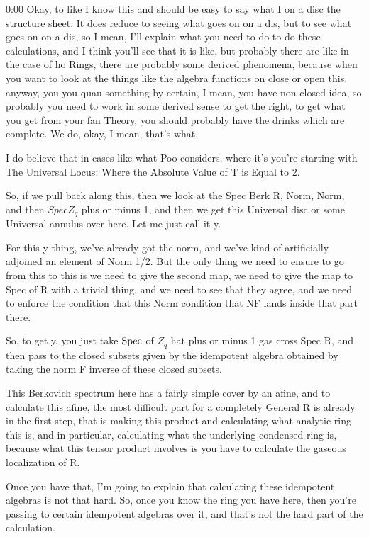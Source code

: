 \begin{unfinished}{0:00}
Okay, to like I know this and should be easy to say what I on a disc the structure sheet. It does reduce to seeing what goes on on a dis, but to see what goes on on a dis, so I mean, I'll explain what you need to do to do these calculations, and I think you'll see that it is like, but probably there are like in the case of ho Rings, there are probably some derived phenomena, because when you want to look at the things like the algebra functions on close or open this, anyway, you you quau something by certain, I mean, you have non closed idea, so probably you need to work in some derived sense to get the right, to get what you get from your fan Theory, you should probably have the drinks which are complete. We do, okay, I mean, that's what.

I do believe that in cases like what Poo considers, where it's you're starting with
The Universal Locus: Where the Absolute Value of T is Equal to 2.

So, if we pull back along this, then we look at the Spec Berk R, Norm, Norm, and then $Spec Z_q$ plus or minus 1, and then we get this Universal disc or some Universal annulus over here. Let me just call it y.

For this y thing, we've already got the norm, and we've kind of artificially adjoined an element of Norm 1/2. But the only thing we need to ensure to go from this to this is we need to give the second map, we need to give the map to Spec of R with a trivial thing, and we need to see that they agree, and we need to enforce the condition that this Norm condition that NF lands inside that part there.

So, to get y, you just take $\operatorname{Spec}$ of $Z_q$ hat plus or minus 1 gas cross Spec R, and then pass to the closed subsets given by the idempotent algebra obtained by taking the norm F inverse of these closed subsets.

This Berkovich spectrum here has a fairly simple cover by an afine, and to calculate this afine, the most difficult part for a completely General R is already in the first step, that is making this product and calculating what analytic ring this is, and in particular, calculating what the underlying condensed ring is, because what this tensor product involves is you have to calculate the gaseous localization of R.

Once you have that, I'm going to explain that calculating these idempotent algebras is not that hard. So, once you know the ring you have here, then you're passing to certain idempotent algebras over it, and that's not the hard part of the calculation.


\end{unfinished}
